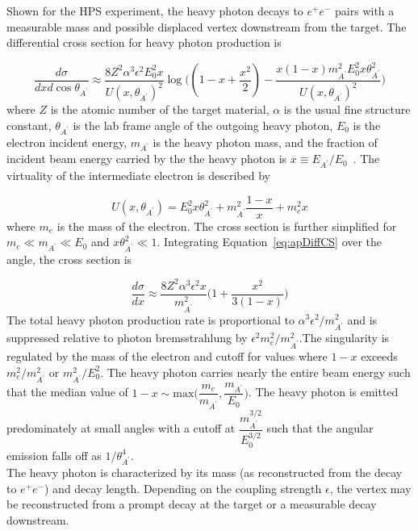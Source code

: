 Shown for the HPS experiment, the heavy photon decays to $e^+e^-$ pairs with a measurable mass and possible displaced vertex downstream from the target. The differential cross section for heavy photon production is 

\begin{equation}
	\label{eq:apDiffCS}
	\dfrac{d\sigma}{dxd\cos\theta_{A^{\prime}}} \approx \dfrac{8Z^2\alpha^3\epsilon^2E_0^2x}{U(x,\theta_{A^{\prime}})^2}\log\Big( (1-x+\dfrac{x^2}{2})-\dfrac{x(1-x)m_{A^{\prime}}^2E_0^2x\theta_{A^{\prime}}^2}{U(x,\theta_{A^{\prime}})^2}\Big)
\end{equation}
where $Z$ is the atomic number of the target material, $\alpha$ is the usual fine structure constant, $\theta_{A^{\prime}}$ is the lab frame angle of the outgoing heavy photon, $E_0$ is the electron incident energy, $m_{A^{\prime}}$ is the heavy photon mass, and the fraction of incident beam energy carried by the the heavy photon is $x\equiv E_{A^{\prime}}/E_0$~\cite{bjorken_new_2009}. The virtuality of the intermediate electron is described by

\begin{equation}
	\label{eq:virtuality}
	U(x,\theta_{A^{\prime}}) = E_0^2x\theta_{A^{\prime}}^2+m_{A^{\prime}}^2\dfrac{1-x}{x}+m_e^2x 
\end{equation}
where $m_e$ is the mass of the electron. The cross section is further simplified for $m_e\ll m_{A^{\prime}}\ll E_0$ and $x\theta_{A^{\prime}}^2\ll 1$. Integrating Equation~\eqref{eq:apDiffCS} over the angle, the cross section is

\begin{equation}
	\label{eq:csFinal}
	\dfrac{d\sigma}{dx} \approx \dfrac{8Z^2\alpha^3\epsilon^2x}{m_{A^{\prime}}^2}\Big(1+\dfrac{x^2}{3(1-x)}\Big)
\end{equation}
The total heavy photon production rate is proportional to $\alpha^3\epsilon^2/m_{A^{\prime}}^2$ and is suppressed relative to photon bremsstrahlung by $\epsilon^2m_e^2/m_{A^{\prime}}^2$.The singularity is regulated by the mass of the electron and cutoff for values where $1-x$ exceeds $m_e^2/m_{A^{\prime}}^2$ or $m_{A^{\prime}}^2/E_0^2$. The heavy photon carries nearly the entire beam energy such that the median value of $1-x\sim\textrm{max}\Big(\dfrac{m_e}{m_{A^{\prime}}}, \dfrac{m_{A^{\prime}}}{E_0}\Big)$. The heavy photon is emitted predominately at small angles with a cutoff at $\dfrac{m_{A^{\prime}}^{3/2}}{E_0^{3/2}}$ such that the angular emission falls off as $1/\theta_{A^{\prime}}^4$.\\
 \indent The heavy photon is characterized by its mass (as reconstructed from the decay to $e^+e^-$) and decay length. Depending on the coupling strength $\epsilon$, the vertex may be reconstructed from a prompt decay at the target or a measurable decay downstream.  

